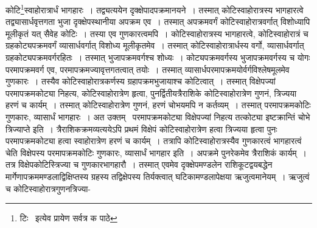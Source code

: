 \documentclass[11pt, openany]{book}
\begin{document}
\noindent कोटि\renewcommand{\thefootnote}{१}\footnote{टिः \textendash\ इत्येव प्रायेण सर्वत्र क पाठे}स्वाहोरात्रार्धं भागहारः~। तद्व्यत्ययेन दृक्क्षेपादपक्रमानयने~। तस्मात् कोटिस्वाहोरात्रस्य भागहारत्वे तद्व्यासार्धवृत्तगता भुजा दृक्क्षेपस्थानीया अपक्रम एव~। तस्मात् अपक्रमवर्गं कोटिस्वाहोरात्रवर्गात् विशोध्यापि मूलीकृतं यत् सैवेह कोटिः~। तस्या एव गुणकारत्वमपि~। कोटिस्वाहोरात्रस्य भागहारत्वे, कोटिस्वाहोरात्रं च ग्रहकोट्यपक्रमवर्गं व्यासार्धवर्गात् विशोध्य मूलीकृतमेव~। तस्मात् कोटिस्वाहोरात्रार्धस्य वर्गो, व्यासार्धवर्गात् ग्रहकोट्यपक्रमवर्गरहितः~। तस्मात् भुजापक्रमवर्गश्च शोध्यः~। कोट्यपक्रमवर्गस्य भुजापक्रमवर्गस्य च योगः परमापक्रमवर्ग एव, परमापक्रमज्यावृत्तगतत्वात् तयोः~। तस्मात् व्यासार्धपरमापक्रमयोर्वर्गविश्लेषमूलमेव गुणकारः~। तस्यैव कोटिस्वाहोरात्रकर्णस्य ग्रहापक्रमभुजायाश्च कोटित्वात्~। तस्मात् विक्षेपज्यां परमापक्रमकोट्या निहत्य, कोटिस्वाहोरात्रेण हृत्वा, पुनर्द्वितीयत्रैराशिके कोटिस्वाहोरात्रेण गुणनं, त्रिज्यया हरणं च कार्यम्~। तस्मात् कोटिस्वाहोरात्रेण गुणनं, हरणं चोभयमपि न कर्तव्यम्~। तस्मात् परमापक्रमकोटिः गुणकारः, व्यासार्धं भागहारः~। अत उक्तम् \textendash\ {\qt परमापक्रमकोट्या विक्षेपज्यां निहत्य तत्कोट्या इष्टक्रान्तिं चोभे त्रिज्याप्ते} इति~। त्रैराशिकक्रमव्यत्ययेऽपि प्रथमं विक्षेपं
कोटिस्वाहोरात्रेण हत्वा त्रिज्यया हृत्वा पुनः परमापक्रमकोट्या हत्वा स्वाहोरात्रेण हरणं च कार्यम्~। तत्रापि कोटिस्वाहोरात्रस्यैव गुणकारत्वं भागहारत्वं चेति विक्षेपस्य परमापक्रमकोटिः गुणकारः, व्यासार्धं भागहार इति~। अपक्रमे पुनरेकमेव त्रैराशिकं कार्यम्~। तत्र विक्षेपकोटिस्त्रिज्या च
गुणकारभागहारौ~। तस्मात् एवमेव दृक्क्षेपमण्डलेन राशिकूटद्वयबद्धेन मार्गेणापक्रममण्डलाद्विक्षिप्तस्य ग्रहस्य तद्विक्षेपस्य तिर्यक्त्वात्
घटिकामण्डलापेक्षया ऋजुत्वमानेयम्~। ऋजुत्वं च कोटिस्वाहोरात्रगुणनत्रिज्या-

\newpage
\end{document}
